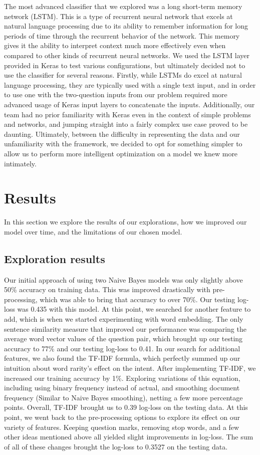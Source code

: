 \documentclass{article}
\begin{document}
The most advanced classifier that we explored was a long short-term memory
network (LSTM). This is a type of recurrent neural network that excels at
natural language processing due to its ability to remember information for long
periods of time through the recurrent behavior of the network. This memory gives
it the ability to interpret context much more effectively even when compared to
other kinds of recurrent neural networks. We used the LSTM layer provided in
Keras to test various configurations, but ultimately decided not to use the
classifier for several reasons. Firstly, while LSTMs do excel at natural
language processing, they are typically used with a single text input, and in
order to use one with the two-question inputs from our problem required more
advanced usage of Keras input layers to concatenate the inputs. Additionally,
our team had no prior familiarity with Keras even in the context of simple
problems and networks, and jumping straight into a fairly complex use case
proved to be daunting. Ultimately, between the difficulty in representing the
data and our unfamiliarity with the framework, we decided to opt for something
simpler to allow us to perform more intelligent optimization on a model we knew
more intimately.

\section{Results}

In this section we explore the results of our explorations, how we improved our
model over time, and the limitations of our chosen model.

\subsection{Exploration results}

Our initial approach of using two Naive Bayes models was only slightly above
50\% accuracy on training data. This was improved drastically with
pre-processing, which was able to bring that accuracy to over 70\%. Our testing
log-loss was 0.435 with this model. At this point, we searched for another
feature to add, which is when we started experimenting with word embedding. The
only sentence similarity measure that improved our performance was comparing the
average word vector values of the question pair, which brought up our testing
accuracy to 77\% and our testing log-loss to 0.41. In our search for additional
features, we also found the TF-IDF formula, which perfectly summed up our
intuition about word rarity’s effect on the intent. After implementing TF-IDF,
we increased our training accuracy by 1\%. Exploring variations of this
equation, including using binary frequency instead of actual, and smoothing
document frequency (Similar to Naive Bayes smoothing), netting a few more
percentage points. Overall, TF-IDF brought us to 0.39 log-loss on the testing
data. At this point, we went back to the pre-processing options to explore its
effect on our variety of features. Keeping question marks, removing stop words,
and a few other ideas mentioned above all yielded slight improvements in
log-loss. The sum of all of these changes brought the log-loss to 0.3527 on the
testing data.
\end{document}
